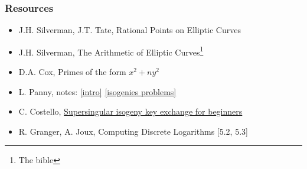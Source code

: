 \documentclass{beamer}
\begin{document}
\begin{frame}
    \frametitle{Resources}
    \begin{itemize}
        \item  J.H. Silverman, J.T. Tate, Rational Points on Elliptic Curves 
        \item  J.H. Silverman, The Arithmetic of Elliptic Curves\footnote{The bible}
        \item  D.A. Cox, Primes of the form $x^2 + n y^2$
        \item L. Panny, notes: \href{https://yx7.cc/docs/misc/isog_bristol_notes.pdf}{[intro]} \href{https://yx7.cc/docs/misc/isogprob_bristol_notes.pdf}{[isogenies problems]}
        \item C. Costello, \href{https://eprint.iacr.org/2019/1321.pdf}{Supersingular isogeny key exchange for beginners}
        \item R. Granger, A. Joux, Computing Discrete Logarithms [5.2, 5.3]
    \end{itemize}
\end{frame}
\end{document}
